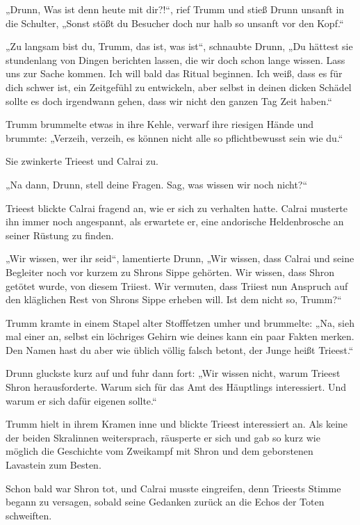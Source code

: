 „Drunn, Was ist denn heute mit dir?!“, rief Trumm und stieß Drunn unsanft in die Schulter, „Sonst stößt du Besucher doch nur halb so unsanft vor den Kopf.“

„Zu langsam bist du, Trumm, das ist, was ist“, schnaubte Drunn, „Du hättest sie stundenlang von Dingen berichten lassen, die wir doch schon lange wissen. Lass uns zur Sache kommen. Ich will bald das Ritual beginnen. Ich weiß, dass es für dich schwer ist, ein Zeitgefühl zu entwickeln, aber selbst in deinen dicken Schädel sollte es doch irgendwann gehen, dass wir nicht den ganzen Tag Zeit haben.“

Trumm brummelte etwas in ihre Kehle, verwarf ihre riesigen Hände und brummte: „Verzeih, verzeih, es können nicht alle so pflichtbewusst sein wie du.“

Sie zwinkerte Trieest und Calrai zu.

„Na dann, Drunn, stell deine Fragen. Sag, was wissen wir noch nicht?“

Trieest blickte Calrai fragend an, wie er sich zu verhalten hatte. Calrai musterte ihn immer noch angespannt, als erwartete er, eine andorische Heldenbrosche an seiner Rüstung zu finden.

„Wir wissen, wer ihr seid“, lamentierte Drunn, „Wir wissen, dass Calrai und seine Begleiter noch vor kurzem zu Shrons Sippe gehörten. Wir wissen, dass Shron getötet wurde, von diesem Triiest. Wir vermuten, dass Triiest nun Anspruch auf den kläglichen Rest von Shrons Sippe erheben will. Ist dem nicht so, Trumm?“

Trumm kramte in einem Stapel alter Stofffetzen umher und brummelte: „Na, sieh mal einer an, selbst ein löchriges Gehirn wie deines kann ein paar Fakten merken. Den Namen hast du aber wie üblich völlig falsch betont, der Junge heißt Trieest.“

Drunn gluckste kurz auf und fuhr dann fort: „Wir wissen nicht, warum Trieest Shron herausforderte. Warum sich für das Amt des Häuptlings interessiert. Und warum er sich dafür eigenen sollte.“

Trumm hielt in ihrem Kramen inne und blickte Trieest interessiert an. Als keine der beiden Skralinnen weitersprach, räusperte er sich und gab so kurz wie möglich die Geschichte vom Zweikampf mit Shron und dem geborstenen Lavastein zum Besten.

Schon bald war Shron tot, und Calrai musste eingreifen, denn Trieests Stimme begann zu versagen, sobald seine Gedanken zurück an die Echos der Toten schweiften.

